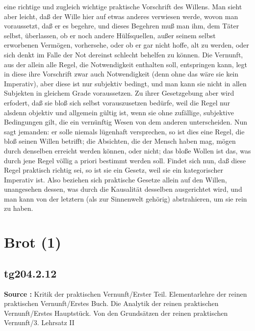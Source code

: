 \documentclass[a4paper,12pt,twoside]{book}
\newcommand{\unnumberedsection}[1]{
	\section*{#1}
	\addcontentsline{toc}{section}{#1}
	\markright{#1}
}
\begin{document}
eine richtige und zugleich wichtige praktische Vorschrift des Willens. Man sieht aber leicht, daß der Wille hier auf etwas anderes verwiesen werde, wovon man voraussetzt, daß er es begehre, und dieses Begehren muß man ihm, dem Täter selbst, überlassen, ob er noch andere Hülfsquellen, außer seinem selbst erworbenen Vermögen, vorhersehe, oder ob er gar nicht hoffe, alt zu werden, oder sich denkt im Falle der Not dereinst schlecht behelfen zu können. Die Vernunft, aus der allein alle Regel, die Notwendigkeit enthalten soll, entspringen kann, legt in diese ihre Vorschrift zwar auch Notwendigkeit (denn ohne das wäre sie kein Imperativ), aber diese ist nur subjektiv bedingt, und man kann sie nicht in allen Subjekten in gleichem Grade voraussetzen. Zu ihrer Gesetzgebung aber wird erfodert, daß sie bloß sich selbst vorauszusetzen bedürfe, weil die Regel nur alsdenn objektiv und allgemein gültig ist, wenn sie ohne zufällige, subjektive Bedingungen gilt, die ein vernünftig Wesen von dem anderen unterscheiden. Nun sagt jemanden: er solle niemals lügenhaft versprechen, so ist dies eine Regel, die bloß seinen Willen betrifft; die Absichten, die der Mensch haben mag, mögen durch denselben erreicht werden können, oder nicht; das bloße Wollen ist das, was durch jene Regel völlig a priori bestimmt werden soll. Findet sich nun, daß diese Regel praktisch richtig sei, so ist sie ein Gesetz, weil sie ein kategorischer Imperativ ist. Also beziehen sich praktische Gesetze allein auf den Willen, unangesehen dessen, was durch die Kausalität desselben ausgerichtet wird, und man kann von der letztern (als zur Sinnenwelt gehörig) abstrahieren, um sie rein zu haben. 
	
	\unnumberedsection{Brot (1)} 
	\subsection*{tg204.2.12} 
	\textbf{Source : }Kritik der praktischen Vernunft/Erster Teil. Elementarlehre der reinen praktischen Vernunft/Erstes Buch. Die Analytik der reinen praktischen Vernunft/Erstes Hauptstück. Von den Grundsätzen der reinen praktischen Vernunft/3. Lehrsatz II\\  
	
\end{document}

